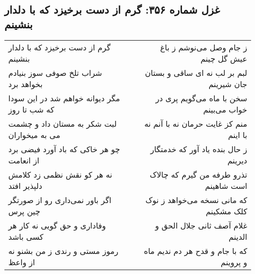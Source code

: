 \begin{center}
\section*{غزل شماره ۳۵۶: گرم از دست برخیزد که با دلدار بنشینم}
\label{sec:sh356}
\begin{longtable}{l p{0.5cm} r}
گرم از دست برخیزد که با دلدار بنشینم
&&
ز جام وصل می‌نوشم ز باغ عیش گل چینم
\\
شراب تلخ صوفی سوز بنیادم بخواهد برد
&&
لبم بر لب نه ای ساقی و بستان جان شیرینم
\\
مگر دیوانه خواهم شد در این سودا که شب تا روز
&&
سخن با ماه می‌گویم پری در خواب می‌بینم
\\
لبت شکر به مستان داد و چشمت می به میخواران
&&
منم کز غایت حرمان نه با آنم نه با اینم
\\
چو هر خاکی که باد آورد فیضی برد از انعامت
&&
ز حال بنده یاد آور که خدمتگار دیرینم
\\
نه هر کو نقش نظمی زد کلامش دلپذیر افتد
&&
تذرو طرفه من گیرم که چالاک است شاهینم
\\
اگر باور نمی‌داری رو از صورتگر چین پرس
&&
که مانی نسخه می‌خواهد ز نوک کلک مشکینم
\\
وفاداری و حق گویی نه کار هر کسی باشد
&&
غلام آصف ثانی جلال الحق و الدینم
\\
رموز مستی و رندی ز من بشنو نه از واعظ
&&
که با جام و قدح هر دم ندیم ماه و پروینم
\\
\end{longtable}
\end{center}
